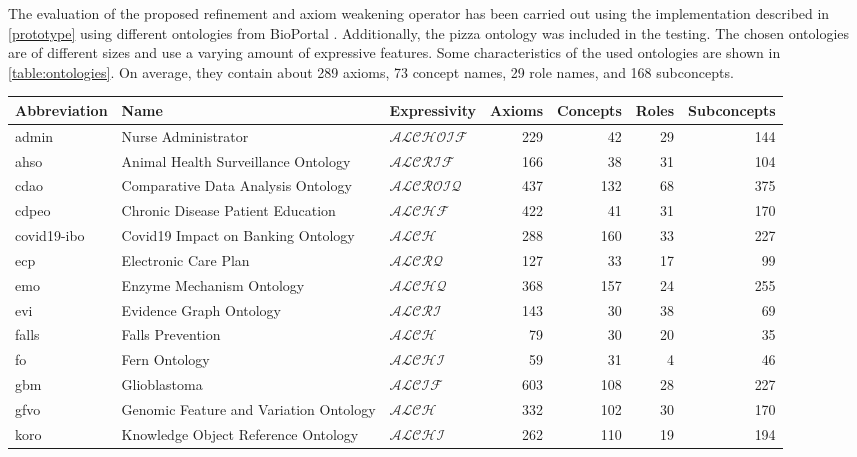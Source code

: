 
The evaluation of the proposed refinement and axiom weakening operator has been carried out using the implementation described in \cref{prototype} using different ontologies from BioPortal \cite{whetzel2011bioportal,bioportal}. Additionally, the pizza ontology \cite{pizzaontology} was included in the testing. The chosen ontologies are of different sizes and use a varying amount of expressive features. Some characteristics of the used ontologies are shown in \cref{table:ontologies}. On average, they contain about 289 axioms, 73 concept names, 29 role names, and 168 subconcepts.

\begin{table}[ht]
  \scriptsize
  \begin{widepage}
    \centering
    \begin{tabular}{|lllrrrr|}
      \hline
      Abbreviation & Name & Expressivity & Axioms & Concepts & Roles & Subconcepts \\
      \hline
      admin & Nurse Administrator & $\mathcal{ALCHOIF}$ & 229 & 42 & 29 & 144 \\
      ahso & Animal Health Surveillance Ontology & $\mathcal{ALCRIF}$ & 166 & 38 & 31 & 104 \\
      cdao & Comparative Data Analysis Ontology & $\mathcal{ALCROIQ}$ & 437 & 132 & 68 & 375 \\
      cdpeo & Chronic Disease Patient Education & $\mathcal{ALCHF}$ & 422 & 41 & 31 & 170 \\
      covid19-ibo & Covid19 Impact on Banking Ontology & $\mathcal{ALCH}$ & 288 & 160 & 33 & 227 \\
      ecp & Electronic Care Plan & $\mathcal{ALCRQ}$ & 127 & 33 & 17 & 99 \\
      emo & Enzyme Mechanism Ontology & $\mathcal{ALCHQ}$ & 368 & 157 & 24 & 255 \\
      evi & Evidence Graph Ontology & $\mathcal{ALCRI}$ & 143 & 30 & 38 & 69 \\
      falls & Falls Prevention & $\mathcal{ALCH}$ & 79 & 30 & 20 & 35 \\
      fo & Fern Ontology & $\mathcal{ALCHI}$ & 59 & 31 & 4 & 46 \\
      gbm & Glioblastoma & $\mathcal{ALCIF}$ & 603 & 108 & 28 & 227 \\
      gfvo & Genomic Feature and Variation Ontology & $\mathcal{ALCH}$ & 332 & 102 & 30 & 170 \\
      koro & Knowledge Object Reference Ontology & $\mathcal{ALCHI}$ & 262 & 110 & 19 & 194 \\

\end{tabular}
\end{widepage}
\end{table}
